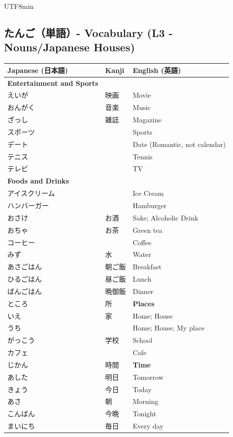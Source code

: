 \documentclass[11pt]{article}
\begin{document}
\begin{CJK}{UTF8}{min}
\subsection{たんご（単語）- Vocabulary (L3 - Nouns/Japanese Houses)}
\begin{tabularx}{\linewidth}{X | X | X}
    \toprule
    \textbf{Japanese (日本語)} & \textbf{Kanji} & \textbf{English (英語)} \\
    \midrule
    \textbf{Entertainment and Sports} &  & \\
    えいが & 映画 & Movie \\
    おんがく & 音楽 & Music \\
    ざっし & 雑誌 & Magazine \\
    スポーツ &  & Sports \\
    デート &  & Date (Romantic, not calendar) \\
    テニス &  & Tennis \\
    テレビ &  & TV \\
    \hline
    \textbf{Foods and Drinks} &  & \\
    アイスクリーム &  & Ice Cream \\
    ハンバーガー &  & Hamburger \\
    おさけ & お酒 & Sake; Alcoholic Drink \\
    おちゃ & お茶 & Green tea \\
    コーヒー &  & Coffee \\
    みず & 水 & Water \\
    あさごはん & 朝ご飯 & Breakfast \\
    ひるごはん & 昼ご飯 & Lunch \\
    ばんごはん & 晩御飯 & Dinner \\
    \hline
    ところ & 所 & \textbf{Places} \\
    いえ & 家 & Home; House \\
    うち &  & Home; House; My place \\
    がっこう & 学校 & School \\
    カフェ &  & Cafe \\
    \hline
    じかん & 時間 & \textbf{Time} \\
    あした & 明日 & Tomorrow \\
    きょう & 今日 & Today \\
    あさ & 朝 & Morning \\
    こんばん & 今晩 & Tonight \\
    まいにち & 毎日 & Every day \\

\end{tabularx}
\end{CJK}
\end{document}
